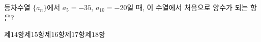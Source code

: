 등차수열 $\{a_n\}$에서 $a_5=-35$, $a_{10}=-20$일 때, 이 수열에서 처음으로 양수가 되는 항은?
\begin{choices32}{제$14$항}{제$15$항}{제$16$항}{제$17$항}{제$18$항}\end{choices32}
